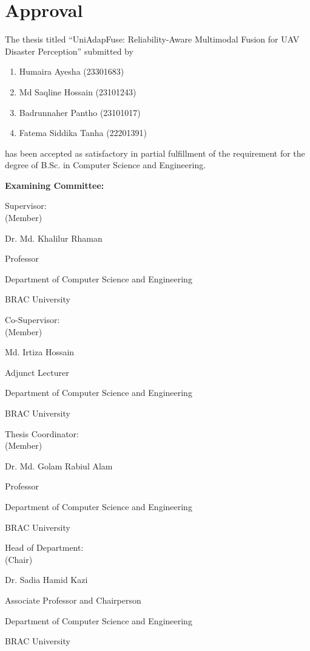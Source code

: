 \section*{Approval}
\renewcommand*\wildcard[2][6cm]{\vspace{1cm}\parbox{#1}{\hrulefill\par#2}}
\begingroup
\setlength{\topsep}{2pt}\setlength{\partopsep}{0pt}

The thesis titled ``UniAdapFuse: Reliability-Aware Multimodal Fusion for UAV Disaster Perception'' submitted by 
\begin{enumerate}\setlength{\itemsep}{0pt}
  \item Humaira Ayesha (23301683)
  \item Md Saqline Hossain (23101243)
  \item Badrunnaher Pantho (23101017) 
  \item Fatema Siddika Tanha (22201391)
\end{enumerate}

has been accepted as satisfactory in partial fulfillment of the requirement for the degree of B.Sc. in Computer Science and Engineering.

\vspace{0.5cm}
\textbf{Examining Committee:}

\vspace{0.2cm}

Supervisor:\\
(Member)
\begin{center}
    \hspace{6cm} \wildcard{\centerline{Dr. Md. Khalilur Rhaman} \centerline{Professor} \centerline{Department of Computer Science and Engineering} \centerline{BRAC University} } \hspace{1cm} 
\end{center}

Co-Supervisor:\\
(Member)
\begin{center}
    \hspace{6cm} \wildcard{\centerline{Md. Irtiza Hossain} \centerline{Adjunct Lecturer } \centerline{Department of Computer Science and Engineering} \centerline{BRAC University} } \hspace{1cm} 
\end{center}


Thesis Coordinator:\\
(Member)
\begin{center}
    \hspace{6cm} \wildcard{\centerline{Dr. Md. Golam Rabiul Alam} \centerline{Professor} \centerline{Department of Computer Science and Engineering} \centerline{BRAC University} } \hspace{1cm} 
\end{center}

Head of Department:\\
(Chair)
\begin{center}
    \hspace{6cm} \wildcard{\centerline{Dr. Sadia Hamid Kazi} \centerline{Associate Professor and Chairperson} \centerline{Department of Computer Science and Engineering } \centerline{BRAC University} } \hspace{1cm} 
\end{center}

\endgroup
\pagebreak

